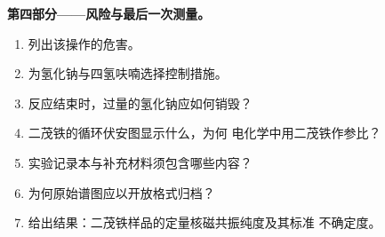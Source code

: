 \begin{problem}
\medskip\noindent\textbf{第四部分——风险与最后一次测量。}
\begin{enumerate}[resume]
  \item 列出该操作的危害。
  \item 为氢化钠与四氢呋喃选择控制措施。
  \item 反应结束时，过量的氢化钠应如何销毁？
  \item 二茂铁的循环伏安图显示什么，为何
        电化学中用二茂铁作参比？
  \item 实验记录本与补充材料须包含哪些内容？
  \item 为何原始谱图应以开放格式归档？
  \item 给出结果：二茂铁样品的定量核磁共振纯度及其标准
        不确定度。
\end{enumerate}
\end{problem}
